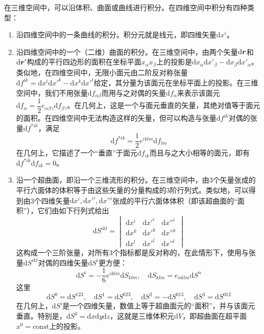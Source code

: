 在三维空间中，可以沿体积、曲面或曲线进行积分。在四维空间中积分有四种类型：
\begin{enumerate}
\item 沿四维空间中的一条曲线的积分。积分元就是线元，即四维矢量$\mathrm{d}x^i$。

\item 沿四维空间中的一个（二维）曲面的积分。在三维空间中，由两个矢量$\mathrm{d}\boldsymbol{r}$和$\mathrm{d}\boldsymbol{r}'$构成的平行四边形的面积在坐标平面$x_\alpha x_\beta$上的投影是$\mathrm{d}x_\alpha \mathrm{d}x'_\beta - \mathrm{d}x_\beta \mathrm{d}x'_\alpha$。类似地，在四维空间中，无限小面元由二阶反对称张量$\mathrm{d}f^{ik}=\mathrm{d}x^i\mathrm{d}x'^k - \mathrm{d}x^k\mathrm{d}x'^i$给定，其分量为该面元在坐标平面上的投影。在三维空间中，我们不用张量$\mathrm{d}f_{\alpha\beta}$而用与之对偶的矢量$\mathrm{d}f_\alpha$来表示该面元$\mathrm{d}f_\alpha = \dfrac12 e_{\alpha\beta\gamma} \mathrm{d}f_{\beta\gamma}$。在几何上，这是一个与面元垂直的矢量，其绝对值等于面元的面积。在四维空间中无法构造这样的矢量，但可以构造与张量$\mathrm{d}f^{ik}$对偶的张量$\mathrm{d}f^{*ik}$，满足
\begin{equation}
	\mathrm{d}f^{*ik} = \frac12 e^{iklm}\mathrm{d}f_{lm}
\end{equation}
在几何上，它描述了一个“垂直”于面元$\mathrm{d}f_{ik}$而且与之大小相等的面元，即有$\mathrm{d}f^{*ik}\mathrm{d}f_{ik} = 0$。

\item 沿一个超曲面，即沿一个三维流形的积分。在三维空间中，由3个矢量张成的平行六面体的体积等于由这些矢量的分量构成的3阶行列式。类似地，可以得到由3个四维矢量$\mathrm{d}x^i,\mathrm{d}x'^i,\mathrm{d}x”^i$张成的平行六面体体积（即该超曲面的“面积”），它们由如下行列式给出
\begin{equation*}
	\mathrm{d}S^{ikl} = \begin{vmatrix} \mathrm{d}x^i & \mathrm{d}x'^i & \mathrm{d}x”^i \\ \mathrm{d}x^k & \mathrm{d}x'^k & \mathrm{d}x”^k \\ \mathrm{d}x^l & \mathrm{d}x'^l & \mathrm{d}x”^l \end{vmatrix}
\end{equation*}
这构成一个三阶张量，对所有3个指标都是反对称的，在此情形下，使用与张量$\mathrm{d}S^{ikl}$对偶的四维矢量$\mathrm{d}S^i$更方便：
\begin{equation}
	\mathrm{d}S^i = -\frac16 e^{iklm} \mathrm{d}S_{klm},\quad \mathrm{d}S_{klm} = e_{nklm}\mathrm{d}S^n
\end{equation}
这里
\begin{equation*}
	\mathrm{d}S^0 = \mathrm{d}S^{123},\quad \mathrm{d}S^1 = \mathrm{d}S^{023},\quad \mathrm{d}S^2 = -\mathrm{d}S^{013},\quad \mathrm{d}S^3 = \mathrm{d}S^{012}
\end{equation*}
在几何上，$\mathrm{d}S^i$是一个四维矢量，数值上等于超曲面元的“面积”，并与该面元垂直。特别是，$\mathrm{d}S^0 = \mathrm{d}x\mathrm{d}y\mathrm{d}z$，这就是三维体积元$\mathrm{d}V$，即超曲面在超平面$x^0=\text{const}$上的投影。


\end{enumerate}
